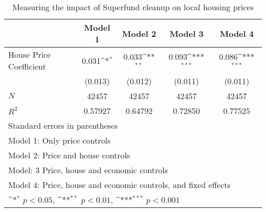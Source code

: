 \begin{table}[htbp]\centering
\def\sym#1{\ifmmode^{#1}\else\(^{#1}\)\fi}
\caption{Measuring the impact of Superfund cleanup on local housing prices}
\begin{tabular}{l*{4}{c}}
\hline\hline
            &\multicolumn{1}{c}{Model 1}&\multicolumn{1}{c}{Model 2}&\multicolumn{1}{c}{Model 3}&\multicolumn{1}{c}{Model 4}\\
\hline
House Price Coefficient&       0.031\sym{*}  &       0.033\sym{**} &       0.093\sym{***}&       0.086\sym{***}\\
            &     (0.013)         &     (0.012)         &     (0.011)         &     (0.011)         \\
\hline
\(N\)       &       42457         &       42457         &       42457         &       42457         \\
\(R^{2}\)   &     0.57927         &     0.64792         &     0.72850         &     0.77525         \\
\hline\hline
\multicolumn{5}{l}{\footnotesize Standard errors in parentheses}\\
\multicolumn{5}{l}{\footnotesize Model 1: Only price controls}\\
\multicolumn{5}{l}{\footnotesize Model 2: Price and house controls}\\
\multicolumn{5}{l}{\footnotesize Model: 3 Price, house and economic controls}\\
\multicolumn{5}{l}{\footnotesize Model 4: Price, house and economic controls, and fixed effects}\\
\multicolumn{5}{l}{\footnotesize \sym{*} \(p<0.05\), \sym{**} \(p<0.01\), \sym{***} \(p<0.001\)}\\
\end{tabular}
\end{table}
